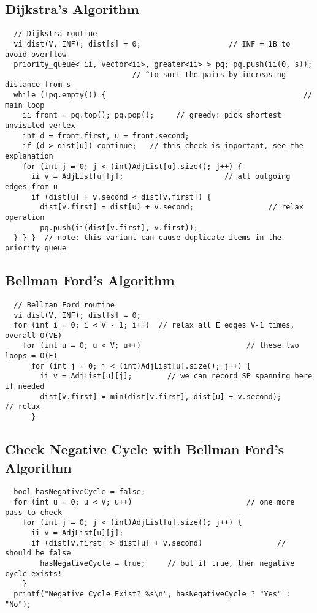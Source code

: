 \documentclass[letterpaper]{article}
\begin{document}
\subsection{Dijkstra's Algorithm}
\begin{lstlisting}
  // Dijkstra routine
  vi dist(V, INF); dist[s] = 0;                    // INF = 1B to avoid overflow
  priority_queue< ii, vector<ii>, greater<ii> > pq; pq.push(ii(0, s));
                             // ^to sort the pairs by increasing distance from s
  while (!pq.empty()) {                                             // main loop
    ii front = pq.top(); pq.pop();     // greedy: pick shortest unvisited vertex
    int d = front.first, u = front.second;
    if (d > dist[u]) continue;   // this check is important, see the explanation
    for (int j = 0; j < (int)AdjList[u].size(); j++) {
      ii v = AdjList[u][j];                       // all outgoing edges from u
      if (dist[u] + v.second < dist[v.first]) {
        dist[v.first] = dist[u] + v.second;                 // relax operation
        pq.push(ii(dist[v.first], v.first));
  } } }  // note: this variant can cause duplicate items in the priority queue
\end{lstlisting}

\subsection{Bellman Ford's Algorithm}
\begin{lstlisting}
  // Bellman Ford routine
  vi dist(V, INF); dist[s] = 0;
  for (int i = 0; i < V - 1; i++)  // relax all E edges V-1 times, overall O(VE)
    for (int u = 0; u < V; u++)                        // these two loops = O(E)
      for (int j = 0; j < (int)AdjList[u].size(); j++) {
        ii v = AdjList[u][j];        // we can record SP spanning here if needed
        dist[v.first] = min(dist[v.first], dist[u] + v.second);         // relax
      }
\end{lstlisting}

\subsection{Check Negative Cycle with Bellman Ford's Algorithm}
\begin{lstlisting}
  bool hasNegativeCycle = false;
  for (int u = 0; u < V; u++)                          // one more pass to check
    for (int j = 0; j < (int)AdjList[u].size(); j++) {
      ii v = AdjList[u][j];
      if (dist[v.first] > dist[u] + v.second)                 // should be false
        hasNegativeCycle = true;     // but if true, then negative cycle exists!
    }
  printf("Negative Cycle Exist? %s\n", hasNegativeCycle ? "Yes" : "No");
\end{lstlisting}
\end{document}
